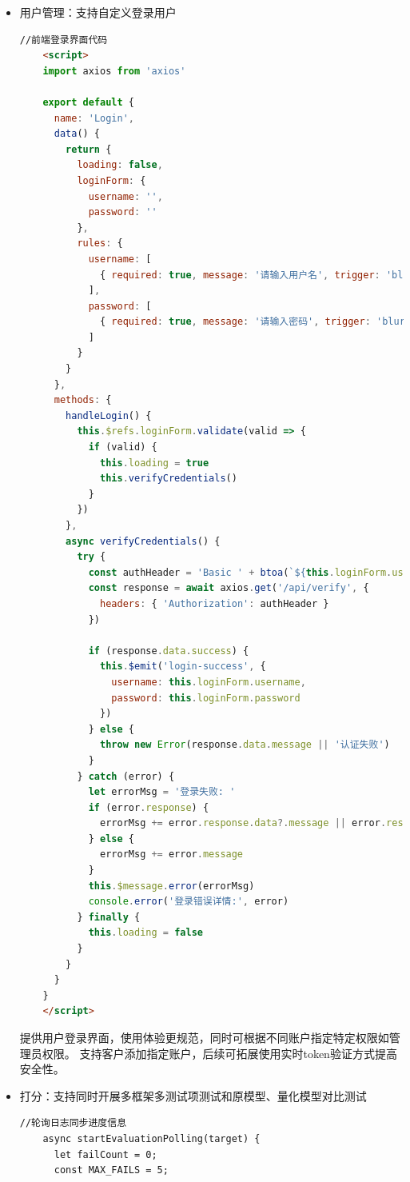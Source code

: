 \documentclass[AutoFakeBold,AutoFakeSlant,language=chinese,degree=bachelor]{sustechthesis}
\begin{document}
\begin{itemize}
    \item 用户管理：支持自定义登录用户
    \begin{lstlisting}[language=HTML]
    //前端登录界面代码
    <script>
    import axios from 'axios'
    
    export default {
      name: 'Login',
      data() {
        return {
          loading: false,
          loginForm: {
            username: '',
            password: ''
          },
          rules: {
            username: [
              { required: true, message: '请输入用户名', trigger: 'blur' }
            ],
            password: [
              { required: true, message: '请输入密码', trigger: 'blur' }
            ]
          }
        }
      },
      methods: {
        handleLogin() {
          this.$refs.loginForm.validate(valid => {
            if (valid) {
              this.loading = true
              this.verifyCredentials()
            }
          })
        },
        async verifyCredentials() {
          try {
            const authHeader = 'Basic ' + btoa(`${this.loginForm.username}:${this.loginForm.password}`)
            const response = await axios.get('/api/verify', {
              headers: { 'Authorization': authHeader }
            })
    
            if (response.data.success) {
              this.$emit('login-success', {
                username: this.loginForm.username,
                password: this.loginForm.password
              })
            } else {
              throw new Error(response.data.message || '认证失败')
            }
          } catch (error) {
            let errorMsg = '登录失败: '
            if (error.response) {
              errorMsg += error.response.data?.message || error.response.statusText
            } else {
              errorMsg += error.message
            }
            this.$message.error(errorMsg)
            console.error('登录错误详情:', error)
          } finally {
            this.loading = false
          }
        }
      }
    }
    </script>
    \end{lstlisting}
    提供用户登录界面，使用体验更规范，同时可根据不同账户指定特定权限如管理员权限。
    支持客户添加指定账户，后续可拓展使用实时token验证方式提高安全性。

    \item 打分：支持同时开展多框架多测试项测试和原模型、量化模型对比测试
    \begin{lstlisting}[language=HTML]
    //轮询日志同步进度信息
    async startEvaluationPolling(target) {
      let failCount = 0;
      const MAX_FAILS = 5;


\end{lstlisting}
\end{itemize}
\end{document}
